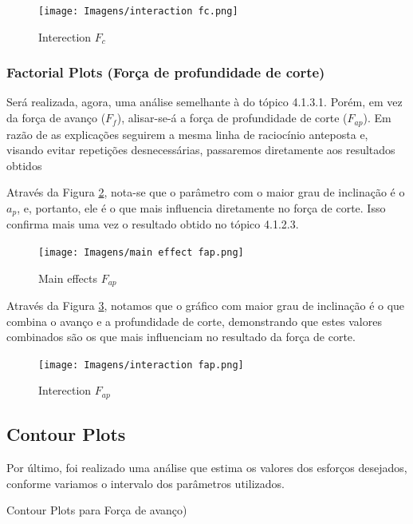 \documentclass[deposito, acronym, symbols]{fei}
\begin{document}
\begin{figure}[!htp]
    \centering
    \caption{Interection $F_c$}
    \texttt{[image: Imagens/interaction fc.png]}
    \label{fig:ifc}
\end{figure}

\subsubsection{Factorial Plots (Força de profundidade de corte)}

Será realizada, agora, uma análise semelhante à do tópico 4.1.3.1. Porém, em vez da força de avanço ($F_f$), alisar-se-á a força de profundidade de corte ($F_{ap}$). Em razão de as explicações seguirem a mesma linha de raciocínio anteposta e, visando evitar repetições desnecessárias, passaremos diretamente aos resultados obtidos

Através da Figura \ref{fig:mfap}, nota-se que o parâmetro com o maior grau de inclinação é o $a_p$, e, portanto, ele é o que mais influencia diretamente no força de corte. Isso confirma mais uma vez o resultado obtido no tópico 4.1.2.3.

\begin{figure}[!htp]
    \centering
    \caption{Main effects $F_{ap}$}
    \texttt{[image: Imagens/main effect fap.png]}
    \label{fig:mfap}
\end{figure}

Através da Figura \ref{fig:ifap}, notamos que o gráfico com maior grau de inclinação é o que combina o avanço e a profundidade de corte, demonstrando que estes valores combinados são os que mais influenciam no resultado da força de corte. 

\begin{figure}[!htp]
    \centering
    \caption{Interection $F_{ap}$}
    \texttt{[image: Imagens/interaction fap.png]}
    \label{fig:ifap}
\end{figure}

\subsection{Contour Plots}

Por último, foi realizado uma análise que estima os valores dos esforços desejados, conforme variamos o intervalo dos parâmetros utilizados. 

Contour Plots para Força de avanço)
\end{document}
